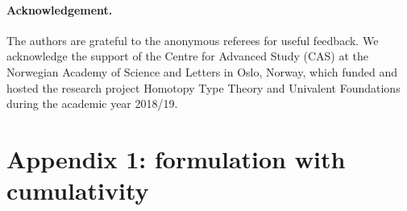 \documentclass[11pt,a4paper]{article}
\theoremstyle{definition}
\newcommand{\NN}{\mathsf{N}}
\newcommand{\UU}{\mathsf{U}}
\newcommand{\mylam}[3]{\lambda_{#1:#2}#3}
\newcommand{\mypi}[3]{\Pi_{#1:#2}#3}
\newcommand{\mysig}[3]{\Sigma_{#1:#2}#3}
\newcommand{\T}{\mathsf{T}}
\begin{document}
\paragraph{Acknowledgement.}
The authors are grateful to the anonymous referees for useful feedback.
We acknowledge the support of the Centre for Advanced Study (CAS)
at the Norwegian Academy of Science and Letters
in Oslo, Norway, which funded and hosted the research project Homotopy
Type Theory and Univalent Foundations during the academic year 2018/19.




\newpage

\section*{Appendix 1: formulation with cumulativity}


\end{document}

